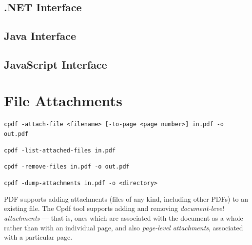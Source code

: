 \documentclass{book}
\begin{document}
\begin{dotnetcpdflib}
\clearpage
\section*{.NET Interface}
\begin{small}\tt

\end{small}
\end{dotnetcpdflib}

\begin{jcpdflib}
\clearpage
\section*{Java Interface}
\begin{small}\tt

\end{small}
\end{jcpdflib}

\begin{jscpdflib}
\clearpage
\section*{JavaScript Interface}
\begin{small}\tt

\end{small}
\end{jscpdflib}

\chapter{File Attachments}\label{chap:12}\pagestyle{fancy}
\begin{framed}
  \small\noindent\verb!cpdf -attach-file <filename> [-to-page <page number>] in.pdf -o out.pdf!

  \vspace{1.5mm}
  \small\noindent\verb!cpdf -list-attached-files in.pdf!
 
  \vspace{1.5mm}
  \small\noindent\verb!cpdf -remove-files in.pdf -o out.pdf!

  \vspace{1.5mm}
  \small\noindent\verb!cpdf -dump-attachments in.pdf -o <directory>!
\end{framed}

  PDF supports adding attachments (files of any kind, including other PDFs) to
an existing file. The Cpdf tool supports adding and removing \textit{document-level
attachments} --- that is, ones which are associated with the document as a
whole rather than with an individual page, and also \textit{page-level attachments}, associated with a particular page.
\end{document}
